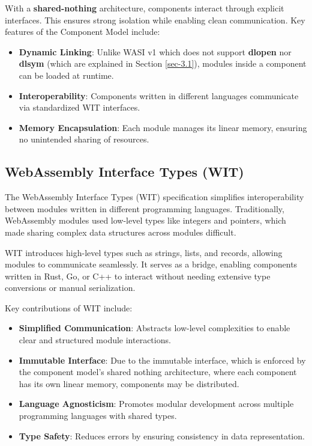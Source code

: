 With a \textbf{shared-nothing} architecture, components interact through explicit interfaces. This ensures strong isolation while enabling clean communication. Key features of the Component Model include:
\begin{itemize}
\item \textbf{Dynamic Linking}: Unlike WASI v1 which does not support \textbf{dlopen} nor \textbf{dlsym} (which are explained in Section \ref{sec-3.1}), modules inside a component can be loaded at runtime.
\item \textbf{Interoperability}: Components written in different languages communicate via standardized WIT interfaces.
\item \textbf{Memory Encapsulation}: Each module manages its linear memory, ensuring no unintended sharing of resources.
\end{itemize}

\subsection{WebAssembly Interface Types (WIT)}
The WebAssembly Interface Types (WIT) specification simplifies interoperability between modules written in different programming languages. Traditionally, WebAssembly modules used low-level types like integers and pointers, which made sharing complex data structures across modules difficult.

WIT introduces high-level types such as strings, lists, and records, allowing modules to communicate seamlessly. It serves as a bridge, enabling components written in Rust, Go, or C++ to interact without needing extensive type conversions or manual serialization.

Key contributions of WIT include:
\begin{itemize}
\item \textbf{Simplified Communication}: Abstracts low-level complexities to enable clear and structured module interactions.
\item \textbf{Immutable Interface}: Due to the immutable interface, which is enforced by the component model's shared nothing architecture, where each component has its own linear memory, components may be distributed.
\item \textbf{Language Agnosticism}: Promotes modular development across multiple programming languages with shared types.
\item \textbf{Type Safety}: Reduces errors by ensuring consistency in data representation.
\end{itemize}

